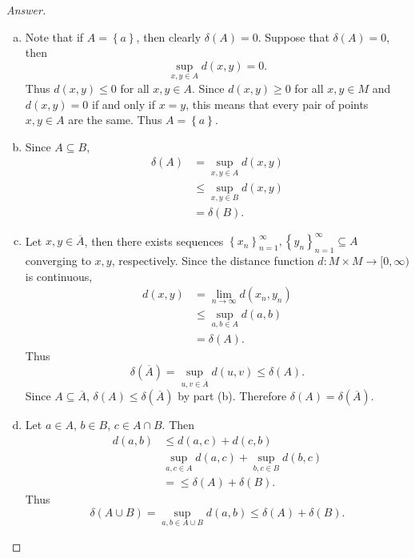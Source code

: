 \documentclass[12pt]{article}
\newcommand\paren[1]{\left( #1 \right)}
\newcommand\setb[1]{\left \{ #1 \right \}}
\theoremstyle{definition}
\begin{document}
\begin{proof}[Answer]
    \noindent
    \begin{enumerate}[(a)]
        \item 
        Note that if $A = \setb{a}$, then clearly $\delta(A) = 0$. Suppose that $\delta(A) = 0$, then 
        \[
            \sup\limits_{x , y \in A} d(x,y) = 0.
        \]
        Thus $d(x,y) \leq 0$ for all $x,y \in A$. Since $d(x,y) \geq 0$ for all $x , y \in M$ and $d(x,y) = 0$ if and only if $x = y$, this means that every pair of points $x,y \in A$ are the same. Thus $A = \setb{ a }$. 
        \item Since $A \subseteq B$, 
        \begin{align*}
            \delta(A) & = \sup\limits_{x , y \in A} d(x,y) \\
            & \leq \sup\limits_{x , y \in B} d(x,y) \\
            & = \delta(B).
        \end{align*}
        \item Let $x , y \in \overline{A}$, then there exists sequences $\setb{ x_n }_{n = 1}^{\infty} , \setb{ y_n }_{n = 1}^{\infty} \subseteq A$ converging to $x, y$, respectively. Since the distance function $d : M \times M \to [0,\infty)$ is continuous, 
        \begin{align*}
            d(x,y) & = \lim\limits_{n \to \infty} d \paren{ x_n , y_n } \\
            & \leq \sup\limits_{a,b \in A} d(a,b) \\
            & = \delta(A).
        \end{align*}
        Thus 
        \[
            \delta \paren{ \overline{A} } = \sup\limits_{u,v \in \overline{A}} d(u,v) \leq \delta(A).
        \]
        Since $A \subseteq \overline{A}$, $\delta(A) \leq \delta \paren{ \overline{A} }$ by part (b). Therefore $\delta(A) = \delta \paren{ \overline{A} }$.
        \item Let $a \in A$, $b \in B$, $c \in A \cap B$. Then 
        \begin{align*}
            d(a,b) & \leq d(a,c) + d(c,b) \\
            & \sup\limits_{a,c \in A} d(a,c) + \sup\limits_{b,c \in B} d(b,c) \\
            & = \leq \delta(A) + \delta(B).
        \end{align*}
        Thus
        \[
            \delta(A \cup B) = \sup\limits_{a , b \in A \cup B} d(a,b) \leq \delta(A) + \delta(B).
        \]
    \end{enumerate}
\end{proof}
\end{document}
